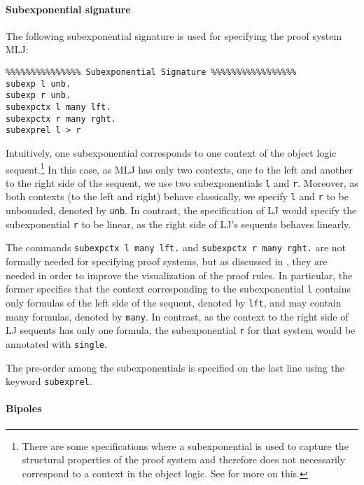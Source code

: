 \documentclass{llncs}
\begin{document}
\paragraph{Subexponential signature}

The following subexponential signature is used for specifying the proof system MLJ:

{\footnotesize
\begin{verbatim}
%%%%%%%%%%%%%%% Subexponential Signature %%%%%%%%%%%%%%%%%
subexp l unb.            
subexp r unb.            
subexpctx l many lft.    
subexpctx r many rght.
subexprel l > r
\end{verbatim}
}

Intuitively, one subexponential corresponds to one context of the object logic sequent.\footnote{There are 
some specifications where a subexponential is used to capture the structural properties of the proof 
system and therefore does not necessarily correspond to a context in the object logic. See \cite{nigam.jlc}
for more on this.}
In this case, as MLJ has only two
contexts, one to the left and another to the right side of the sequent, we use two subexponentials
\texttt{l} and \texttt{r}. Moreover, as both contexts (to the left and right) behave classically, 
we specify \texttt{l} and \texttt{r} to be unbounded, denoted by \texttt{unb}. In contrast, 
the specification of LJ would specify the subexponential \texttt{r} to be linear, as the right side of LJ's 
sequents behaves linearly.

The commands \texttt{subexpctx l many lft.} and  \texttt{subexpctx r many rght.} are not formally needed for specifying proof systems, 
but as discussed 
in \cite{nigam14ebl}, they are needed in order to improve the visualization of the proof rules. 
In particular, the former specifies that the context corresponding to the subexponential \texttt{l} contains 
only formulas of the left side of the sequent, denoted by \texttt{lft}, and may contain many formulas, denoted 
by \texttt{many}. In contrast, as the context to the right side of LJ sequents has only one formula, the 
subexponential \texttt{r} for that system would be annotated with \texttt{single}.

The pre-order among the subexponentials is specified on the last line using the
keyword \texttt{subexprel}.

\paragraph{Bipoles}
\end{document}
